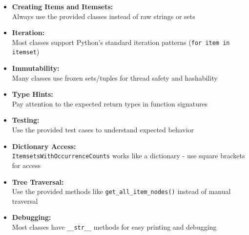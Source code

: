 \documentclass[
english,
smallborders
]{i6prcsht}
\begin{document}
\begin{itemize}
	\item \textbf{Creating Items and Itemsets:} \\ Always use the provided classes instead of raw strings or sets
	\item \textbf{Iteration:} \\ Most classes support Python's standard iteration patterns (\texttt{for item in itemset})
	\item \textbf{Immutability:} \\ Many classes use frozen sets/tuples for thread safety and hashability
	\item \textbf{Type Hints:} \\ Pay attention to the expected return types in function signatures
	\item \textbf{Testing:} \\ Use the provided test cases to understand expected behavior
	\item \textbf{Dictionary Access:} \\ \texttt{ItemsetsWithOccurrenceCounts} works like a dictionary - use square brackets for access
	\item \textbf{Tree Traversal:} \\ Use the provided methods like \texttt{get\_all\_item\_nodes()} instead of manual traversal
	\item \textbf{Debugging:} \\ Most classes have \texttt{\_\_str\_\_} methods for easy printing and debugging
\end{itemize}

\vspace*{0.3cm}
\end{document}
